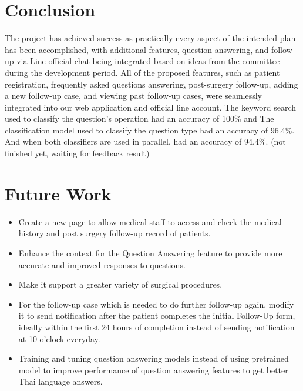 \documentclass[12pt,oneside,openright,a4paper]{cpe-english-project}
\begin{document}
      \section{Conclusion}
        \qquad The project has achieved success as practically every aspect of the intended plan has been accomplished, with additional features, question answering, and follow-up via Line official chat being integrated based on ideas from the committee during the development period. All of the proposed features, such as patient registration, frequently asked questions answering, post-surgery follow-up, adding a new follow-up case, and viewing past follow-up cases, were seamlessly integrated into our web application and official line account. The keyword search used to classify the question’s  operation had an accuracy of 100\% and The classification model used to classify the question type had an accuracy of 96.4\%. And when both classifiers are used in parallel, had an accuracy of 94.4\%. (not finished yet,  waiting for feedback result) \par
      \section{Future Work}
        \begin{itemize}
          \item Create a new page to allow medical staff to access and check the medical history and post surgery follow-up record of patients. 
          \item Enhance the context for the Question Answering feature to provide more accurate and improved responses to questions.
          \item Make it support a greater variety of surgical procedures.
          \item For the follow-up case which is needed to do further follow-up again, modify it to send notification after the patient completes the initial Follow-Up form, ideally within the first 24 hours of completion instead of sending notification at 10 o'clock everyday.
          \item Training and tuning question answering models instead of using pretrained model to improve performance of question answering features to get better Thai language answers.                  
        \end{itemize}  

  
\end{document}
